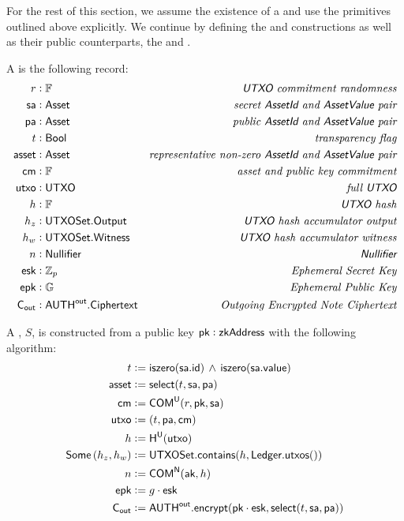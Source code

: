 For the rest of this section, we assume the existence of a \TransferConfiguration{} and use the primitives outlined above explicitly. We continue by defining the \Sender{} and \Receiver{} constructions as well as their public counterparts, the \SenderPost{} and \ReceiverPost{}.

\begin{definition}
    A \Sender{} is the following record:
    \begin{align*}
        r      &: {\mathbb{F}}                   & \textit{{\textsf{UTXO}}{} commitment randomness} \\
        {\textsf{sa}}    &: {\textsf{Asset}}               & \textit{secret {\textsf{AssetId}}{} and {\textsf{AssetValue}}{} pair} \\
        {\textsf{pa}}    &: {\textsf{Asset}}               & \textit{public {\textsf{AssetId}}{} and {\textsf{AssetValue}}{} pair} \\
        t      &: {\textsf{Bool}}                & \textit{transparency flag} \\
        {\textsf{asset}} &: {\textsf{Asset}}               & \textit{representative non-zero {\textsf{AssetId}}{} and {\textsf{AssetValue}}{} pair} \\
        {\textsf{cm}}    &: {\mathbb{F}}                   & \textit{asset and public key commitment} \\
        {\textsf{utxo}}  &: {\textsf{UTXO}}                & \textit{full {\textsf{UTXO}}{}} \\
        h      &: {\mathbb{F}}                   & \textit{{\textsf{UTXO}}{} hash} \\
        h_z    &: {\textsf{UTXOSet}}.{\textsf{Output}}     & \textit{{\textsf{UTXO}}{} hash accumulator output} \\
        h_w    &: {\textsf{UTXOSet}}.{\textsf{Witness}}    & \textit{{\textsf{UTXO}}{} hash accumulator witness} \\
        n      &: {\textsf{Nullifier}}           & \textit{{\textsf{Nullifier}}{}} \\
        {\textsf{esk}}   &: {\mathbb{Z}}_p                 & \textit{Ephemeral Secret Key} \\
        {\textsf{epk}}   &: {\mathbb{G}}                   & \textit{Ephemeral Public Key} \\
        {\textsf{C}_\textsf{out}}  &: {{\textsf{AUTH}}^\textsf{out}}.{\textsf{Ciphertext}} & \textit{Outgoing Encrypted Note Ciphertext} 
    \end{align*}

    A \Sender{}, $S$, is constructed from a public key ${\textsf{pk}} : {\textsf{zkAddress}}$ with the following algorithm:
    \begin{align*}
        t      &:= {\textsf{iszero}}({\textsf{sa}}.{\textsf{id}}) \,\wedge\, {\textsf{iszero}}({\textsf{sa}}.{\textsf{value}}) \\
        {\textsf{asset}} &:= {\textsf{select}}(t, {\textsf{sa}}, {\textsf{pa}}) \\
        {\textsf{cm}}    &:= {\textsf{COM}}^{{\textsf{U}}}(r, {\textsf{pk}}, {\textsf{sa}}) \\
        {\textsf{utxo}}  &:= (t, {\textsf{pa}}, {\textsf{cm}}) \\
        h      &:= {\textsf{H}}^{{\textsf{U}}}({\textsf{utxo}}) \\
        {\textsf{Some}}\left(h_z, h_w\right) &:= {\textsf{UTXOSet}}.{\textsf{contains}}(h, {\textsf{Ledger}}.{\textsf{utxos}}()) \\
        n      &:= {\textsf{COM}}^{\textsf{N}}({\textsf{ak}}, h) \\
        {\textsf{epk}}   &:= g \cdot {\textsf{esk}} \\
        {\textsf{C}_\textsf{out}}  &:= {{\textsf{AUTH}}^\textsf{out}}.{\textsf{encrypt}}({\textsf{pk}} \cdot {\textsf{esk}}, {\textsf{select}}(t, {\textsf{sa}}, {\textsf{pa}}))
    \end{align*}
\end{definition}

